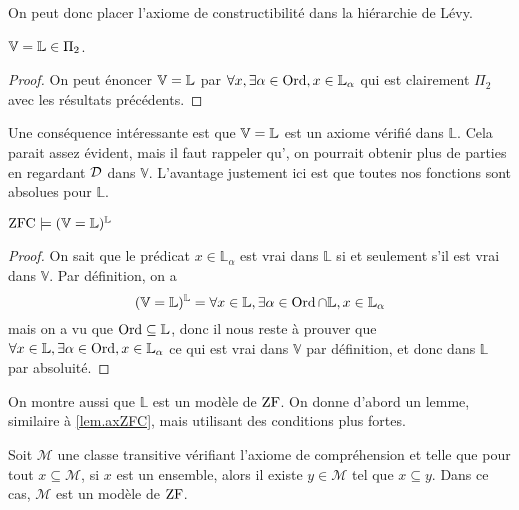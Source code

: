 On peut donc placer l'axiome de constructibilité dans la hiérarchie de Lévy.

\begin{proposition}
  $\mathbb V = \mathbb L \in \Pi_2$.
\end{proposition}

\begin{proof}
  On peut énoncer $\mathbb V = \mathbb L$ par
  $\forall x, \exists \alpha \in \operatorname{Ord}, x\in \mathbb L_\alpha$ qui est clairement
  $\Pi_2$ avec les résultats précédents.
\end{proof}

Une conséquence intéressante est que $\mathbb V = \mathbb L$ est un axiome vérifié dans
$\mathbb L$. Cela parait assez évident, mais il faut rappeler
qu', on pourrait obtenir plus de parties en regardant
$\mathcal{D}$ dans $\mathbb V$. L'avantage justement ici est que toutes nos
fonctions sont absolues pour $\mathbb L$. 

\begin{theorem}
  $\operatorname{ZFC}\models (\mathbb V = \mathbb L)^{\mathbb L}$
\end{theorem}

\begin{proof}
  On sait que le prédicat $x\in \mathbb L_{\alpha}$ est vrai dans
  $\mathbb L$ si et seulement s'il est vrai dans $\mathbb V$. Par définition,
  on a
  \[(\mathbb V = \mathbb L)^{\mathbb L} =
  \forall x \in \mathbb L,\exists \alpha \in \operatorname{Ord}\cap \mathbb L,
  x\in \mathbb L_\alpha\]
  mais on a vu que $\operatorname{Ord}\subseteq \mathbb L$, donc il nous reste à prouver que
  $\forall x \in \mathbb L, \exists \alpha \in \operatorname{Ord}, x \in \mathbb L_\alpha$
  ce qui est vrai dans $\mathbb V$ par définition, et donc dans
  $\mathbb L$ par absoluité.
\end{proof}

On montre aussi que $\mathbb L$ est un modèle de $\operatorname{ZF}$. On donne d'abord un
lemme, similaire à \cref{lem.axZFC}, mais utilisant des conditions plus fortes.

\begin{lemma}\label{lem.axZFC2}
  Soit $\mathcal M$ une classe transitive vérifiant l'axiome de compréhension
  et telle que pour tout $x \subseteq \mathcal M$, si $x$ est un ensemble, alors
  il existe $y \in \mathcal M$ tel que $x \subseteq y$. Dans ce cas,
  $\mathcal M$ est un modèle de $\operatorname{ZF}$.
\end{lemma}

